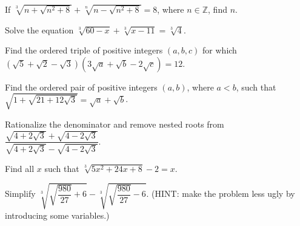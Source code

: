 \documentclass[../book.tex]{subfiles}
\begin{document}
\begin{challengeset}
\item If $\sqrt[3]{n+\sqrt{n^2+8}}+\sqrt[n]{n-\sqrt{n^2+8}}=8$, where $n\in\mathbb{Z}$, find $n$. \vspace{3mm}
\item Solve the equation $\sqrt[3]{60-x}+\sqrt[3]{x-11}=\sqrt[3]{4}$. \vspace{3mm}
\item Find the ordered triple of positive integers $(a,b,c)$ for which $\left(\sqrt{5}+\sqrt{2}-\sqrt{3}\right)\left(3\sqrt{a}+\sqrt{b}-2\sqrt{c}\right)=12.$ \vspace{3mm}
\item Find the ordered pair of positive integers $(a,b)$, where $a<b$, such that $\sqrt{1+\sqrt{21+12\sqrt{3}}}=\sqrt{a}+\sqrt{b}$. \vspace{3mm}
\item Rationalize the denominator and remove nested roots from $\dfrac{\sqrt{4+2\sqrt{3}}+\sqrt{4-2\sqrt{3}}}{\sqrt{4+2\sqrt{3}}-\sqrt{4-2\sqrt{3}}}$. \vspace{3mm}
\item Find all $x$ such that $\sqrt[3]{5x^2+24x+8}-2=x$. \vspace{3mm}
\item Simplify $\sqrt[3]{\sqrt{\dfrac{980}{27}}+6}-\sqrt[3]{\sqrt{\dfrac{980}{27}}-6}$. (HINT: make the problem less ugly by introducing some variables.) \vspace{3mm}
\end{challengeset}
\end{document}
